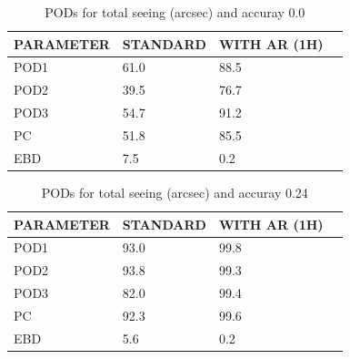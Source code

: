 \documentclass[a4paper,english]{article}
\begin{document}
\newpage

\clearpage
\begin{table}[]
\begin{center}
\begin{tabular}{|l|l|l|l|}
\hline
\multicolumn{1}{|c|}{\cellcolor[HTML]{C0C0C0}\textbf{PARAMETER}} & \multicolumn{1}{c|}{\cellcolor[HTML]{C0C0C0}\textbf{STANDARD}} & \multicolumn{1}{c|}{\cellcolor[HTML]{C0C0C0}\textbf{WITH AR (1H)}} \\
\hline
\cellcolor[HTML]{C0C0C0}POD1  & 61.0                                & 88.5         \\
\cellcolor[HTML]{C0C0C0}POD2  & 39.5                                & 76.7         \\
\cellcolor[HTML]{C0C0C0}POD3  & 54.7                                & 91.2         \\
\cellcolor[HTML]{C0C0C0}PC    & 51.8                                  & 85.5           \\
\cellcolor[HTML]{C0C0C0}EBD   & 7.5                                 & 0.2          \\
\hline
\end{tabular}
\caption{PODs for total seeing (arcsec) and accuray 0.0}
\end{center}
\end{table}
\begin{table}[]
\begin{center}
\begin{tabular}{|l|l|l|l|}
\hline
\multicolumn{1}{|c|}{\cellcolor[HTML]{C0C0C0}\textbf{PARAMETER}} & \multicolumn{1}{c|}{\cellcolor[HTML]{C0C0C0}\textbf{STANDARD}} & \multicolumn{1}{c|}{\cellcolor[HTML]{C0C0C0}\textbf{WITH AR (1H)}} \\
\hline
\cellcolor[HTML]{C0C0C0}POD1  & 93.0                                & 99.8         \\
\cellcolor[HTML]{C0C0C0}POD2  & 93.8                                & 99.3         \\
\cellcolor[HTML]{C0C0C0}POD3  & 82.0                                & 99.4         \\
\cellcolor[HTML]{C0C0C0}PC    & 92.3                                  & 99.6           \\
\cellcolor[HTML]{C0C0C0}EBD   & 5.6                                 & 0.2          \\
\hline
\end{tabular}
\caption{PODs for total seeing (arcsec) and accuray 0.24}
\end{center}
\end{table}
\end{document}

